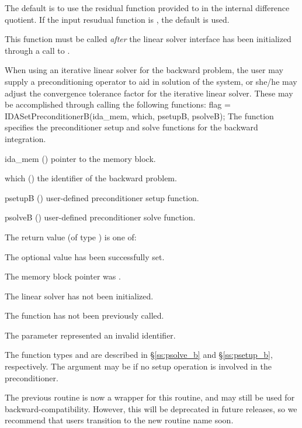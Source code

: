 {
  The default is to use the residual function provided to  in the
  internal difference quotient. If the input resudual function is ,
  the default is used.

  This function must be called \emph{after} the {\idals} linear solver interface
  has been initialized through a call to .
}
When using an iterative linear solver for the backward problem, the
user may supply a preconditioning operator to aid in solution of the
system, or she/he may adjust the convergence tolerance factor for the
iterative linear solver.  These may be accomplished through calling
the following functions:
{
  flag = IDASetPreconditionerB(ida\_mem, which, psetupB, psolveB);
}
{
  The function  specifies the preconditioner
  setup and solve functions for the backward integration.
}
{
  \begin{args}[psetupB]
  \item[ida\_mem] ()
    pointer to the {\idas} memory block.
  \item[which] ()
    the identifier of the backward problem.
  \item[psetupB] ()
    user-defined preconditioner setup function.
  \item[psolveB] ()
    user-defined preconditioner solve function.
  \end{args}
}
{
  The return value  (of type ) is one of:
  \begin{args}
  \item[\Id{IDALS\_SUCCESS}]
    The optional value has been successfully set.
  \item[\Id{IDALS\_MEM\_NULL}]
    The  memory block pointer was .
  \item[\Id{IDALS\_LMEM\_NULL}]
    The {\idals} linear solver has not been initialized.
  \item[\Id{IDALS\_NO\_ADJ}]
    The function  has not been previously called.
  \item[\Id{IDALS\_ILL\_INPUT}]
    The parameter  represented an invalid identifier.
  \end{args}
}
{
  The function types  and  are
  described in \S\ref{ss:psolve_b} and \S\ref{ss:psetup_b}, respectively.
  The  argument may be  if no setup operation is involved
  in the preconditioner.

  The previous routine  is now a
  wrapper for this routine, and may still be used for
  backward-compatibility.  However, this will be deprecated in future
  releases, so we recommend that users transition to the new routine
  name soon.
}
